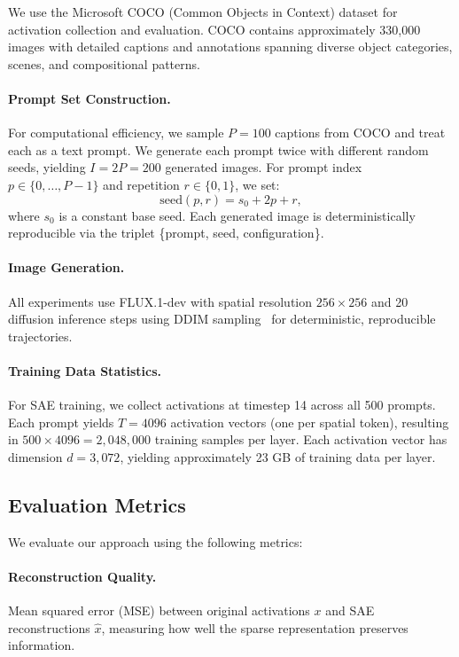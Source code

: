 \documentclass{article}
\begin{document}
We use the Microsoft COCO (Common Objects in Context) dataset for activation collection and evaluation. COCO contains approximately 330,000 images with detailed captions and annotations spanning diverse object categories, scenes, and compositional patterns.

\paragraph{Prompt Set Construction.}
For computational efficiency, we sample $P=100$ captions from COCO and treat each as a text prompt. We generate each prompt twice with different random seeds, yielding $I = 2P = 200$ generated images. For prompt index $p \in \{0,\dots,P-1\}$ and repetition $r \in \{0,1\}$, we set:
\begin{equation}
\mathrm{seed}(p,r) = s_0 + 2p + r,
\end{equation}
where $s_0$ is a constant base seed. Each generated image is deterministically reproducible via the triplet \{prompt, seed, configuration\}.

\paragraph{Image Generation.}
All experiments use FLUX.1-dev with spatial resolution $256 \times 256$ and 20 diffusion inference steps using DDIM sampling~\citep{Song2020DDIM} for deterministic, reproducible trajectories.

\paragraph{Training Data Statistics.}
For SAE training, we collect activations at timestep 14 across all 500 prompts. Each prompt yields $T = 4096$ activation vectors (one per spatial token), resulting in $500 \times 4096 = 2{,}048{,}000$ training samples per layer. Each activation vector has dimension $d = 3{,}072$, yielding approximately 23 GB of training data per layer.

\subsection{Evaluation Metrics}

We evaluate our approach using the following metrics:

\paragraph{Reconstruction Quality.}
Mean squared error (MSE) between original activations $x$ and SAE reconstructions $\hat{x}$, measuring how well the sparse representation preserves information.
\end{document}
